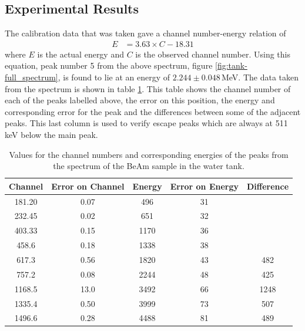 \subsection{Experimental Results} %
\label{sub:experimental_results}
The calibration data that was taken gave a channel number-energy relation of
\begin{align}
	E &= 3.63\times C - 18.31
\end{align}
where $E$ is the actual energy and $C$ is the observed channel number. Using this equation, peak number 5 from the above spectrum, figure \ref{fig:tank-full_spectrum}, is found to lie at an energy of $2.244\pm0.048$\,MeV. The data taken from the spectrum is shown in table \ref{tab:tankdata}. This table shows the channel number of each of the peaks labelled above, the error on this position, the energy and corresponding error for the peak and the differences between some of the adjacent peaks. This last column is used to verify escape peaks which are always at 511\,keV below the main peak.
\begin{table}[ht]
	\centering
	\begin{tabular}{c|c|c|c|c}
		Channel \textnumero & Error on Channel \textnumero & Energy & Error on Energy & Difference \\
		\hline\hline
		181.20 & 0.07 & 496 & 31 & \\
		232.45 & 0.02 & 651 & 32 &  \\
		403.33 & 0.15 & 1170 & 36 &  \\
		458.6 & 0.18 & 1338 & 38 &  \\
		617.3 & 0.56 & 1820 & 43 & 482 \\
		757.2 & 0.08 & 2244 & 48 & 425 \\
		1168.5 & 13.0 & 3492 & 66 & 1248 \\
		1335.4 & 0.50 & 3999 & 73 & 507 \\
		1496.6 & 0.28 & 4488 & 81 & 489
	\end{tabular}
	\caption{Values for the channel numbers and corresponding energies of the peaks from the spectrum of the BeAm sample in the water tank.\label{tab:tankdata}}
\end{table}

